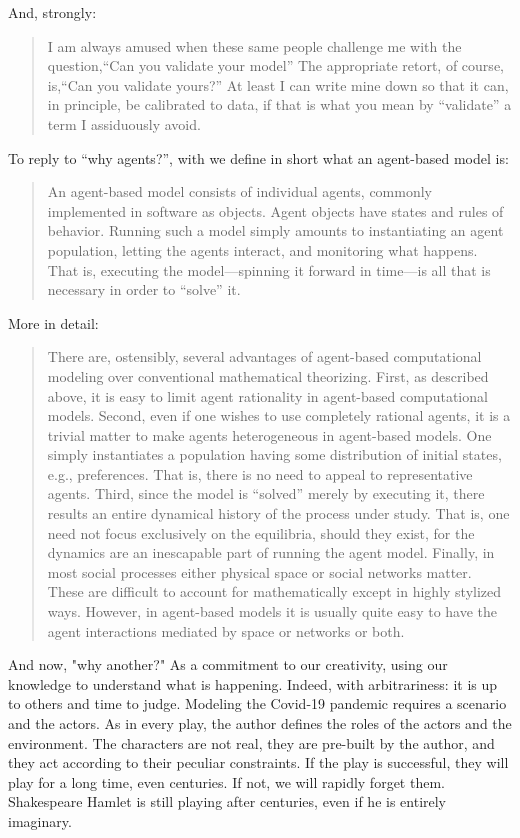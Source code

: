 \documentclass[11pt]{article}
\begin{document}
And, strongly:
\begin{quote} 
I am always amused when these same people challenge me with the question,``Can you validate your model'' The appropriate retort, of course, is,``Can you validate yours?'' At least I can write mine down so that it can, in principle, be calibrated to data, if that is what you mean by ``validate'' a term I assiduously avoid.
\end{quote}

To reply to ``why agents?'', with \cite{axtell2000agents} we define in short what an agent-based model is:
\begin{quote} 
An agent-based model consists of individual agents, commonly implemented in software as objects. Agent objects have states and rules of behavior. Running such a model simply amounts to instantiating an agent population, letting the agents interact, and monitoring what happens. That is, executing the model---spinning it forward in time---is all that is necessary in order to ``solve'' it.
\end{quote}

More in detail:
\begin{quote} 
There are, ostensibly, several advantages of agent-based computational modeling over conventional mathematical theorizing. First, as described above, it is easy to limit agent rationality in agent-based computational models. Second, even if one wishes to use completely rational agents, it is a trivial matter to make agents heterogeneous in agent-based models. One simply instantiates a population having some distribution of initial states, e.g., preferences. That is, there is no need to appeal to representative agents. Third, since the model is ``solved'' merely by executing it, there results an entire dynamical history of the process under study. That is, one need not focus exclusively on the equilibria, should they exist, for the dynamics are an inescapable part of running the agent model. Finally, in most social processes either physical space or social networks matter. These are difficult to account for mathematically except in highly stylized ways. However, in agent-based models it is usually quite easy to have the agent interactions mediated by space or networks or both.
\end{quote}

And now, "why another?" As a commitment to our creativity, using our knowledge to understand what is happening. Indeed, with arbitrariness: it is up to others and time to judge. Modeling the Covid-19 pandemic requires a scenario and the actors.
As in every play, the author defines the roles of the actors and the environment. The characters are not real, they are pre-built by the author, and they act according to their peculiar constraints. If the play is successful, they will play for a long time, even centuries. If not, we will rapidly forget them. Shakespeare Hamlet is still playing after centuries, even if he is entirely imaginary.
\end{document}
